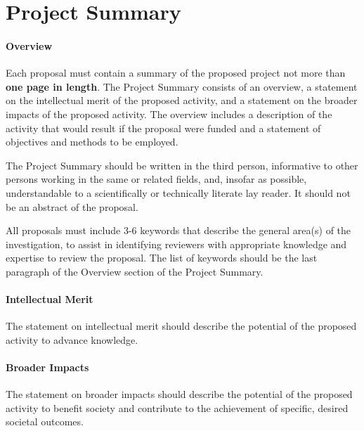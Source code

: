 \section*{Project Summary}

\ifdraft {}
\paragraph*{Overview}
Each proposal must contain a summary of the proposed project not more than {\bf one page in length}. The Project
Summary consists of an overview, a statement on the intellectual merit of the proposed activity, and a statement
on the broader impacts of the proposed activity.
The overview includes a description of the activity that would result if the proposal were funded and a statement
of objectives and methods to be employed.

The Project Summary should be written in the third person, informative to other persons working in
the same or related fields, and, insofar as possible, understandable to a scientifically or technically
literate lay reader. It should not be an abstract of the proposal.


All proposals must include 3-6 keywords that describe the general
area(s) of the investigation, to assist in identifying reviewers with
appropriate knowledge and expertise to review the proposal. The list
of keywords should be the last paragraph of the Overview section of
the Project Summary.

\iflater{}\fi

\paragraph*{Intellectual Merit}
The statement on intellectual merit should describe the potential of the proposed activity to advance knowledge.

\paragraph*{Broader Impacts}
The statement on broader impacts should describe the potential of the proposed activity to benefit society and contribute to the achievement of specific, desired societal outcomes.
\fi